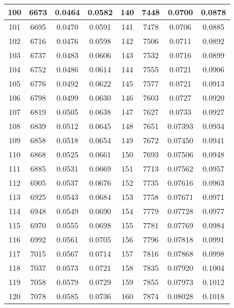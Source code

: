 \begin{table}[!h]
\begin{tabular}{|c||c|c|c||c||c|c|c|}
        100 & 6673 & 0.0464 & 0.0582 & 140 & 7448 & 0.0700 & 0.0878  \\\hline
        101 & 6695 & 0.0470 & 0.0591 & 141 & 7478 & 0.0706 & 0.0885  \\\hline
        102 & 6716 & 0.0476 & 0.0598 & 142 & 7506 & 0.0711 & 0.0892  \\\hline
        103 & 6737 & 0.0483 & 0.0606 & 143 & 7532 & 0.0716 & 0.0899  \\\hline
        104 & 6752 & 0.0486 & 0.0614 & 144 & 7555 & 0.0721 & 0.0906  \\\hline
        105 & 6776 & 0.0492 & 0.0622 & 145 & 7577 & 0.0721 & 0.0913  \\\hline
        106 & 6798 & 0.0499 & 0.0630 & 146 & 7603 & 0.0727 & 0.0920  \\\hline
        107 & 6819 & 0.0505 & 0.0638 & 147 & 7627 & 0.0733 & 0.0927  \\\hline
        108 & 6839 & 0.0512 & 0.0645 & 148 & 7651 & 0.07393 & 0.0934 \\\hline
        109 & 6858 & 0.0518 & 0.0654 & 149 & 7672 & 0.07450 & 0.0941 \\\hline
        110 & 6868 & 0.0525 & 0.0661 & 150 & 7693 & 0.07506 & 0.0948 \\\hline
        111 & 6885 & 0.0531 & 0.0669 & 151 & 7713 & 0.07562 & 0.0957 \\\hline
        112 & 6905 & 0.0537 & 0.0676 & 152 & 7735 & 0.07616 & 0.0963 \\\hline
        113 & 6925 & 0.0543 & 0.0684 & 153 & 7758 & 0.07671 & 0.0971 \\\hline
        114 & 6948 & 0.0549 & 0.0690 & 154 & 7779 & 0.07728 & 0.0977 \\\hline
        115 & 6970 & 0.0555 & 0.0698 & 155 & 7781 & 0.07769 & 0.0984 \\\hline
        116 & 6992 & 0.0561 & 0.0705 & 156 & 7796 & 0.07818 & 0.0991 \\\hline
        117 & 7015 & 0.0567 & 0.0714 & 157 & 7816 & 0.07868 & 0.0998 \\\hline
        118 & 7037 & 0.0573 & 0.0721 & 158 & 7835 & 0.07920 & 0.1004 \\\hline
        119 & 7058 & 0.0579 & 0.0729 & 159 & 7855 & 0.07973 & 0.1012 \\\hline
        120 & 7078 & 0.0585 & 0.0736 & 160 & 7874 & 0.08028 & 0.1018 \\\bottomrule
    \end{tabular}
    \label{tab:3}
\end{table}


